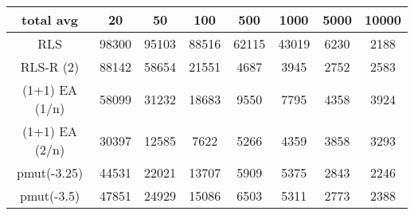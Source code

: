 \begin{tabular}[h]{cccccccc}
total avg&20&50&100&500&1000&5000&10000\\\hline
RLS&98300&95103&88516&62115&43019&6230&2188\\
RLS-R (2)&88142&58654&21551&4687&3945&2752&2583\\
(1+1) EA (1/n)&58099&31232&18683&9550&7795&4358&3924\\
(1+1) EA (2/n)&30397&12585&7622&5266&4359&3858&3293\\
pmut(-3.25)&44531&22021&13707&5909&5375&2843&2246\\
pmut(-3.5)&47851&24929&15086&6503&5311&2773&2388\\
\end{tabular}

